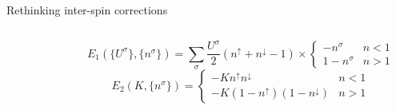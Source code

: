 \documentclass[xcolor=table,aspectratio=169]{beamer}
\numberwithin{equation}{section}
\begin{document}
\begin{frame}{Rethinking inter-spin corrections}
\begin{columns}
\begin{figure}
        \end{figure}
        \begin{equation}
            E_1(\{U^\sigma\}, \{n^\sigma\}) =
            \sum_\sigma \frac{U^\sigma}{2} \left(n^\uparrow + n^\downarrow - 1\right) \times
            \begin{cases}
                -n^\sigma    & n < 1 \\
                1 - n^\sigma & n > 1
            \end{cases}
        \end{equation}
        \begin{equation}
            E_2(K, \{n^\sigma\}) %
            = \begin{cases}
                - Kn^\uparrow n^\downarrow            & n < 1 \\
                - K(1 - n^\uparrow)(1 - n^\downarrow) & n > 1
            \end{cases}
        \end{equation}


\end{columns}
\end{frame}
\end{document}
